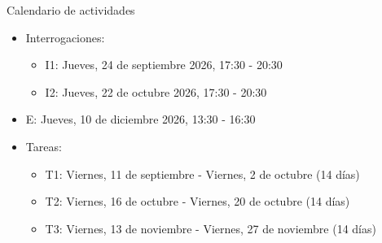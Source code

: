 \documentclass{beamer}
\begin{document}
    \begin{frame}[label=calendario]{Calendario de actividades}
        \begin{itemize}
            \item Interrogaciones:
            \begin{itemize}
                \item I1: Jueves, 24 de septiembre 2026, 17:30 - 20:30
                \item I2: Jueves, 22 de octubre 2026, 17:30 - 20:30
            \end{itemize}
            \item E: Jueves, 10 de diciembre 2026, 13:30 - 16:30
            \item Tareas:
            \begin{itemize}
                \item T1: Viernes, 11 de septiembre - Viernes, 2 de octubre (14 días)
                \item T2: Viernes, 16 de octubre - Viernes, 20 de octubre (14 días)
                \item T3: Viernes, 13 de noviembre - Viernes, 27 de noviembre (14 días)
            \end{itemize}
        \end{itemize}
    \end{frame}


\end{document}
